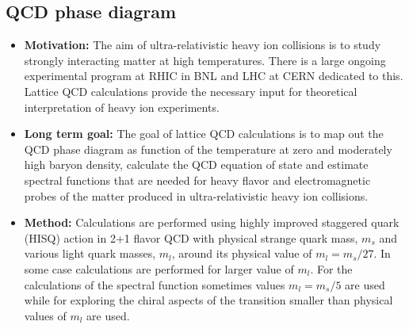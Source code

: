 \documentclass[12pt,hyperpdf]{article}
\begin{document}
\subsection{QCD phase diagram}\label{sec:qcdphase}
\begin{itemize}
  \item{\bf Motivation:} The aim of ultra-relativistic heavy ion
    collisions is to study strongly interacting matter at high
    temperatures. There is a large ongoing experimental program at
    RHIC in BNL and LHC at CERN dedicated to this. Lattice QCD
    calculations provide the necessary input for theoretical
    interpretation of heavy ion experiments. 

 \item{\bf Long term goal:} The goal of lattice QCD calculations is to
      map out the QCD phase diagram as function of the temperature at
      zero and moderately high baryon density, calculate the QCD
      equation of state and estimate spectral functions that are
      needed for heavy flavor and electromagnetic probes of the matter
      produced in ultra-relativistic heavy ion
      collisions. \item{\bf Method:} Calculations are performed using
      highly improved staggered quark (HISQ) action in 2+1 flavor QCD
      with physical strange quark mass, $m_s$ and various light quark
      masses, $m_l$,  around its physical value of $m_l=m_s/27$. In
      some case calculations are performed for larger value of
      $m_l$. For the calculations of the spectral function sometimes
      values $m_l=m_s/5$ are used while for exploring the chiral
      aspects of the transition smaller than physical values of $m_l$
      are used. 


\end{itemize}
\end{document}
